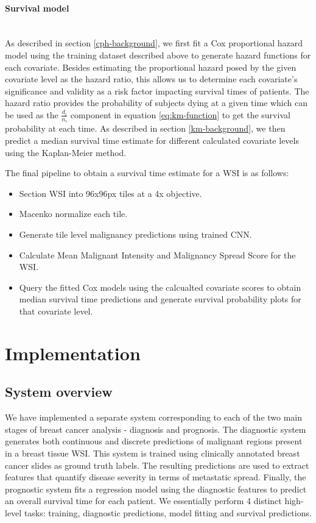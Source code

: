 \documentclass{l4proj}
\begin{document}
\subsubsection{Survival model}
\hfill\\
As described in section \ref{cph-background}, we first fit a Cox proportional hazard model using the training dataset described above to generate hazard functions for each covariate. Besides estimating the proportional hazard posed by the given covariate level as the hazard ratio, this allows us to determine each covariate's significance and validity as a risk factor impacting survival times of patients. The hazard ratio provides the probability of subjects dying at a given time which can be used as the \(\frac{d_i}{n_i}\) component in equation \ref{eq:km-function} to get the survival probability at each time. As described in section \ref{km-background}, we then predict a median survival time estimate for different calculated covariate levels using the Kaplan-Meier method. 

The final pipeline to obtain a survival time estimate for a WSI is as follows:
\begin{itemize}
    \item Section WSI into 96x96px tiles at a 4x objective.
    \item Macenko normalize each tile.
    \item Generate tile level malignancy predictions using trained CNN. 
    \item Calculate Mean Malignant Intensity and Malignancy Spread Score for the WSI. 
    \item Query the fitted Cox models using the calcualted covariate scores to obtain median survival time predictions and generate survival probability plots for that covariate level.  
\end{itemize}

\chapter{Implementation}
\section{System overview}
We have implemented a separate system corresponding to each of the two main stages of breast cancer analysis - diagnosis and prognosis. The diagnostic system generates both continuous and discrete predictions of malignant regions present in a breast tissue WSI. This system is trained using clinically annotated breast cancer slides as ground truth labels. The resulting predictions are used to extract features that quantify disease severity in terms of metastatic spread. Finally, the prognostic system fits a regression model using the diagnostic features to predict an overall survival time for each patient. We essentially perform 4 distinct high-level tasks: training, diagnostic predictions, model fitting and survival predictions. 
\end{document}
